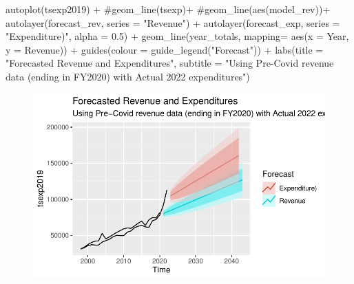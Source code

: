 \documentclass[
  letterpaper,
  DIV=11,
  numbers=noendperiod]{scrreport}
\newenvironment{Shaded}{\begin{snugshade}}{\end{snugshade}}
\newcommand{\AttributeTok}[1]{\textcolor[rgb]{0.40,0.45,0.13}{#1}}
\newcommand{\CommentTok}[1]{\textcolor[rgb]{0.37,0.37,0.37}{#1}}
\newcommand{\FloatTok}[1]{\textcolor[rgb]{0.68,0.00,0.00}{#1}}
\newcommand{\FunctionTok}[1]{\textcolor[rgb]{0.28,0.35,0.67}{#1}}
\newcommand{\NormalTok}[1]{\textcolor[rgb]{0.00,0.23,0.31}{#1}}
\newcommand{\SpecialCharTok}[1]{\textcolor[rgb]{0.37,0.37,0.37}{#1}}
\newcommand{\StringTok}[1]{\textcolor[rgb]{0.13,0.47,0.30}{#1}}
\begin{document}
\begin{Shaded}
\begin{Highlighting}[]
\FunctionTok{autoplot}\NormalTok{(tsexp2019) }\SpecialCharTok{+}
  \CommentTok{\#geom\_line(tsexp)+}
  \CommentTok{\#geom\_line(aes(model\_rev))+}
  \FunctionTok{autolayer}\NormalTok{(forecast\_rev, }\AttributeTok{series =} \StringTok{"Revenue"}\NormalTok{) }\SpecialCharTok{+}
  \FunctionTok{autolayer}\NormalTok{(forecast\_exp, }\AttributeTok{series =} \StringTok{"Expenditure)"}\NormalTok{, }\AttributeTok{alpha =} \FloatTok{0.5}\NormalTok{) }\SpecialCharTok{+}
  \FunctionTok{geom\_line}\NormalTok{(year\_totals, }\AttributeTok{mapping=} \FunctionTok{aes}\NormalTok{(}\AttributeTok{x =}\NormalTok{ Year, }\AttributeTok{y =}\NormalTok{ Revenue))  }\SpecialCharTok{+} \FunctionTok{guides}\NormalTok{(}\AttributeTok{colour =} \FunctionTok{guide\_legend}\NormalTok{(}\StringTok{"Forecast"}\NormalTok{)) }\SpecialCharTok{+} 
  \FunctionTok{labs}\NormalTok{(}\AttributeTok{title =} \StringTok{"Forecasted Revenue and Expenditures"}\NormalTok{, }\AttributeTok{subtitle =} \StringTok{"Using Pre{-}Covid revenue data (ending in FY2020) with Actual 2022 expenditures"}\NormalTok{)}
\end{Highlighting}
\end{Shaded}

\begin{figure}[H]

{\centering \includegraphics{./Everything_files/figure-pdf/unnamed-chunk-31-2.pdf}

}

\end{figure}
\end{document}
